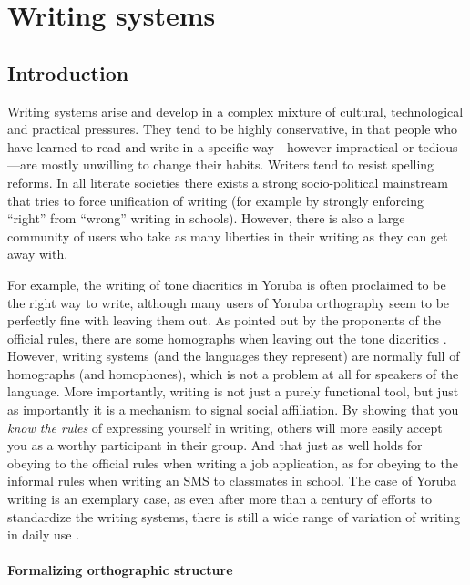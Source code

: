 \chapter{Writing systems}
\label{writing_systems}

\section{Introduction}
\label{introduction}

Writing systems arise and develop in a complex mixture of cultural,
technological and practical pressures. They tend to be highly conservative, in
that people who have learned to read and write in a specific way---however
impractical or tedious---are mostly unwilling to change their habits. Writers
tend to resist spelling reforms. In all literate societies there exists a strong
socio-political mainstream that tries to force unification of writing (for
example by strongly enforcing ``right'' from ``wrong'' writing in schools).
However, there is also a large community of users who take as many liberties in
their writing as they can get away with.

For example, the writing of tone diacritics in Yoruba is often proclaimed to be
the right way to write, although many users of Yoruba orthography seem to be
perfectly fine with leaving them out. As pointed out by the proponents of the
official rules, there are some homographs when leaving out the tone diacritics
\citep[44]{Olumuyiw2013}. However, writing systems (and the languages they
represent) are normally full of homographs (and homophones), which is 
not a problem at all for speakers of the language. More importantly, writing is
not just a purely functional tool, but just as importantly it is a mechanism to
signal social affiliation. By showing that you \textit{know the rules} of
expressing yourself in writing, others will more easily accept you as a worthy
participant in their group. And that just as well holds for obeying to the
official rules when writing a job application, as for obeying to the informal
rules when writing an SMS to classmates in school. The case of Yoruba writing is
an exemplary case, as even after more than a century of efforts to standardize
the writing systems, there is still a wide range of variation of writing in
daily use \citep{Olumuyiw2013}.

\subsubsection*{Formalizing orthographic structure}

